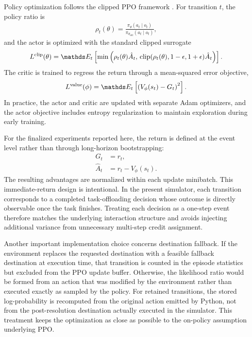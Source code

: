 Policy optimization follows the clipped PPO framework \cite{schulman2017ppo}. For transition \(t\), the policy ratio is
\begin{align}
\rho_t(\theta) =
\frac{\pi_{\theta}(a_t \mid o_t)}{\pi_{\theta_{\mathrm{old}}}(a_t \mid o_t)},
\end{align}
and the actor is optimized with the standard clipped surrogate
\begin{align}
L^{\mathrm{clip}}(\theta) =
\E_t \left[
\min \left(
\rho_t(\theta)\hat{A}_t,\,
\mathrm{clip}(\rho_t(\theta), 1-\epsilon, 1+\epsilon)\hat{A}_t
\right)
\right].
\end{align}
The critic is trained to regress the return through a mean-squared error objective,
\begin{align}
L^{\mathrm{value}}(\phi) = \E_t \left[\left(V_{\phi}(s_t) - G_t\right)^2\right].
\end{align}
In practice, the actor and critic are updated with separate Adam optimizers, and the actor objective includes entropy regularization to maintain exploration during early training.

For the finalized experiments reported here, the return is defined at the event level rather than through long-horizon bootstrapping:
\begin{align}
G_t &= r_t, \\
\hat{A}_t &= r_t - V_{\phi}(s_t).
\end{align}
The resulting advantages are normalized within each update minibatch. This immediate-return design is intentional. In the present simulator, each transition corresponds to a completed task-offloading decision whose outcome is directly observable once the task finishes. Treating each decision as a one-step event therefore matches the underlying interaction structure and avoids injecting additional variance from unnecessary multi-step credit assignment.

Another important implementation choice concerns destination fallback. If the environment replaces the requested destination with a feasible fallback destination at execution time, that transition is counted in the episode statistics but excluded from the PPO update buffer. Otherwise, the likelihood ratio would be formed from an action that was modified by the environment rather than executed exactly as sampled by the policy. For retained transitions, the stored log-probability is recomputed from the original action emitted by Python, not from the post-resolution destination actually executed in the simulator. This treatment keeps the optimization as close as possible to the on-policy assumption underlying PPO.

